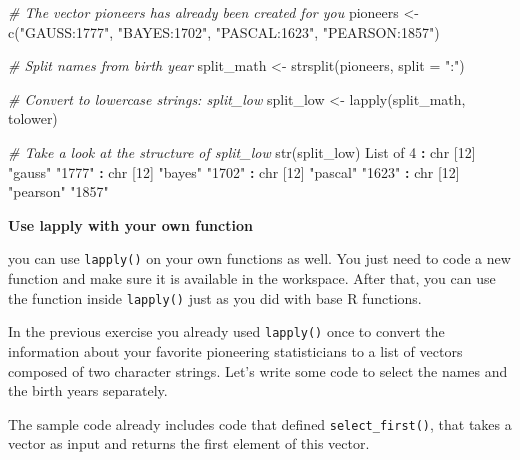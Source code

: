 \documentclass[]{article}
\newcommand{\hlnum}[1]{\textcolor[rgb]{0.816,0.125,0.439}{#1}}%
\newcommand{\hlstr}[1]{\textcolor[rgb]{0.251,0.627,0.251}{#1}}%
\newcommand{\hlcom}[1]{\textcolor[rgb]{0.502,0.502,0.502}{\textit{#1}}}%
\newcommand{\hlstd}[1]{\textcolor[rgb]{0.251,0.251,0.251}{#1}}%
\newcommand{\hlkwc}[1]{\textcolor[rgb]{0.251,0.251,0.251}{#1}}%
\newcommand{\hlkwd}[1]{\textcolor[rgb]{0.878,0.439,0.125}{#1}}%
\newenvironment{Shaded}{\begin{myshaded}}{\end{myshaded}}
\newcommand{\KeywordTok}[1]{\hlkwd{#1}}
\newcommand{\DataTypeTok}[1]{\hlkwc{#1}}
\newcommand{\DecValTok}[1]{\hlnum{#1}}
\newcommand{\StringTok}[1]{\hlstr{#1}}
\newcommand{\CommentTok}[1]{\hlcom{#1}}
\newcommand{\ErrorTok}[1]{\textbf{{#1}}}
\newcommand{\NormalTok}[1]{\hlstd{#1}}
\begin{document}
\begin{Shaded}
\begin{Highlighting}[]
\CommentTok{# The vector pioneers has already been created for you}
\NormalTok{pioneers <-}\StringTok{ }\KeywordTok{c}\NormalTok{(}\StringTok{"GAUSS:1777"}\NormalTok{, }\StringTok{"BAYES:1702"}\NormalTok{, }\StringTok{"PASCAL:1623"}\NormalTok{, }\StringTok{"PEARSON:1857"}\NormalTok{)}

\CommentTok{# Split names from birth year}
\NormalTok{split_math <-}\StringTok{ }\KeywordTok{strsplit}\NormalTok{(pioneers, }\DataTypeTok{split =} \StringTok{":"}\NormalTok{)}

\CommentTok{# Convert to lowercase strings: split_low}
\NormalTok{split_low <-}\StringTok{ }\KeywordTok{lapply}\NormalTok{(split_math, tolower)}

\CommentTok{# Take a look at the structure of split_low}
\KeywordTok{str}\NormalTok{(split_low)}
\NormalTok{   List of }\DecValTok{4}
    \OperatorTok{$}\StringTok{ }\ErrorTok{:}\StringTok{ }\NormalTok{chr [}\DecValTok{1}\OperatorTok{:}\DecValTok{2}\NormalTok{] }\StringTok{"gauss"} \StringTok{"1777"}
    \OperatorTok{$}\StringTok{ }\ErrorTok{:}\StringTok{ }\NormalTok{chr [}\DecValTok{1}\OperatorTok{:}\DecValTok{2}\NormalTok{] }\StringTok{"bayes"} \StringTok{"1702"}
    \OperatorTok{$}\StringTok{ }\ErrorTok{:}\StringTok{ }\NormalTok{chr [}\DecValTok{1}\OperatorTok{:}\DecValTok{2}\NormalTok{] }\StringTok{"pascal"} \StringTok{"1623"}
    \OperatorTok{$}\StringTok{ }\ErrorTok{:}\StringTok{ }\NormalTok{chr [}\DecValTok{1}\OperatorTok{:}\DecValTok{2}\NormalTok{] }\StringTok{"pearson"} \StringTok{"1857"}
\end{Highlighting}
\end{Shaded}

\textbf{Use lapply with your own function}

you can use \texttt{lapply()} on your own functions as well. You just
need to code a new function and make sure it is available in the
workspace. After that, you can use the function inside \texttt{lapply()}
just as you did with base R functions.

In the previous exercise you already used \texttt{lapply()} once to
convert the information about your favorite pioneering statisticians to
a list of vectors composed of two character strings. Let's write some
code to select the names and the birth years separately.

The sample code already includes code that defined
\texttt{select\_first()}, that takes a vector as input and returns the
first element of this vector.
\end{document}
